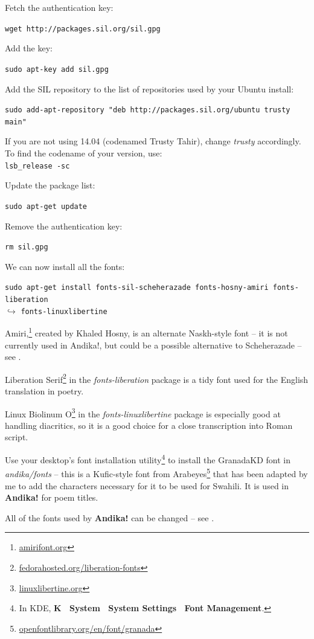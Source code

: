 Fetch the authentication key:

\verb|wget http://packages.sil.org/sil.gpg|

Add the key:

\verb|sudo apt-key add sil.gpg|

Add the SIL repository to the list of repositories used by your Ubuntu install:

\verb|sudo add-apt-repository "deb http://packages.sil.org/ubuntu trusty main"|

If you are not using 14.04 (codenamed Trusty Tahir), change \textit{trusty} accordingly.  To find the codename of your version, use:\\
\verb|lsb_release -sc|

Update the package list:

\verb|sudo apt-get update|

Remove the authentication key:

\verb|rm sil.gpg|

We can now install all the fonts:

\verb|sudo apt-get install fonts-sil-scheherazade fonts-hosny-amiri fonts-liberation|\\
$\hookrightarrow$ \verb|fonts-linuxlibertine|

Amiri,\footnote{\url{amirifont.org}} created by Khaled Hosny, is an alternate Naskh-style font -- it is not currently used in Andika!, but could be a possible alternative to Scheherazade -- see .

Liberation Serif\footnote{\url{fedorahosted.org/liberation-fonts}} in the \textit{fonts-liberation} package is a tidy font used for the English translation in poetry.

Linux Biolinum O\footnote{\url{linuxlibertine.org}} in the \textit{fonts-linuxlibertine} package is especially good at handling diacritics, so it is a good choice for a close transcription into Roman script.

Use your desktop's font installation utility\footnote{In KDE, \textbf{K \textrightarrow\ System \textrightarrow\ System Settings \textrightarrow\ Font Management}.} to install the GranadaKD font in \textit{andika/fonts} -- this is a Kufic-style font from Arabeyes\footnote{\url{openfontlibrary.org/en/font/granada}} that has been adapted by me to add the characters necessary for it to be used for Swahili.  It is used in \textbf{Andika!} for poem titles.

All of the fonts used by \textbf{Andika!} can be changed -- see .

